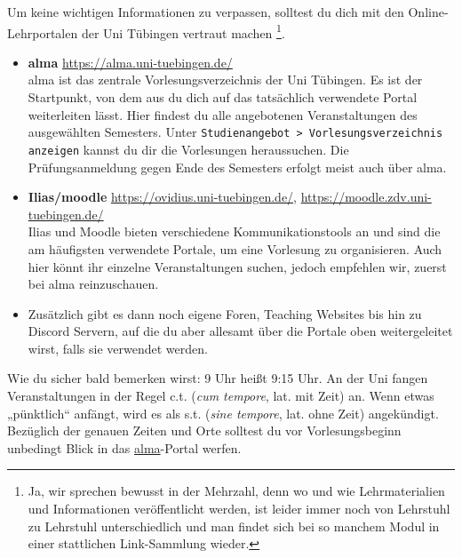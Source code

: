 Um keine wichtigen Informationen zu verpassen, solltest du dich mit den Online-Lehrportalen der Uni Tübingen vertraut machen
\footnote{Ja, wir sprechen bewusst in der Mehrzahl, denn wo und wie Lehrmaterialien und Informationen veröffentlicht werden, ist leider immer noch
von Lehrstuhl zu Lehrstuhl unterschiedlich und man findet sich bei so manchem Modul in einer stattlichen Link-Sammlung wieder.}.
\begin{itemize}
	\item \textbf{\hypertarget{alma}{alma}} \url{https://alma.uni-tuebingen.de/} \\
	alma ist das zentrale Vorlesungsverzeichnis der Uni Tübingen. Es ist der Startpunkt, von dem aus du dich auf das tatsächlich verwendete Portal weiterleiten lässt.
	Hier findest du alle angebotenen Veranstaltungen des ausgewählten Semesters. Unter \texttt{Studienangebot > Vorlesungsverzeichnis anzeigen} kannst du dir die Vorlesungen heraussuchen. Die Prüfungsanmeldung gegen Ende des Semesters erfolgt meist auch über alma.
	\item \textbf{Ilias/moodle} \url{https://ovidius.uni-tuebingen.de/}, \url{https://moodle.zdv.uni-tuebingen.de/} \\
	Ilias und Moodle bieten verschiedene Kommunikationstools an und sind die am häufigsten verwendete Portale, um eine Vorlesung zu organisieren.
	Auch hier könnt ihr einzelne Veranstaltungen suchen, jedoch empfehlen wir, zuerst bei alma reinzuschauen.
	\item Zusätzlich gibt es dann noch eigene Foren, Teaching Websites bis hin zu Discord Servern, auf die du aber allesamt über die Portale oben
	weitergeleitet wirst, falls sie verwendet werden.
\end{itemize}


Wie du sicher bald bemerken wirst: 9 Uhr heißt 9:15 Uhr. An der Uni fangen Veranstaltungen in der Regel c.t. (\textit{cum
tempore}, lat. \glqq mit Zeit\grqq) an. Wenn etwas „pünktlich“ anfängt, wird es als s.t. (\textit{sine tempore}, lat. \glqq ohne
Zeit\grqq) angekündigt.
Bezüglich der genauen Zeiten und Orte solltest du vor Vorlesungsbeginn unbedingt Blick in das \hyperlink{alma}{alma}-Portal werfen.

\ifmaster \pagebreak \fi

